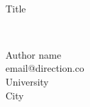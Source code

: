 \documentclass[letterpaper,11pt]{article}
\begin{document}

\tiny \texttt{}\\


\begin{center}
\LARGE \color{Black} {Title} \\ 
\end{center}
\color{Black}
\tiny \texttt{}
\large \textbf{}  \\

\begin{center}
Author name\\
\small email@direction.co\\
\small University \\
\small City\\
\end{center}


\vspace{0.2cm}



\vspace{0.15cm} %

\renewcommand{\refname}{}
\end{document}
